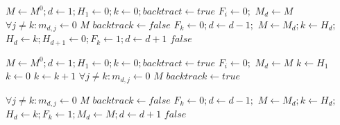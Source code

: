 \documentclass[a4paper, 12pt, ]{book}
\begin{document}
\begin{algorithm}
\label{alg:ullmann1}
\begin{algorithmic}[1]
	\State $M \gets M^0; d \gets 1; H_1 \gets 0; k \gets 0; backtract \gets true$
	 $F_i \gets 0;$ \EndFor
			\State $M_d \gets M$
			\State $\forall j \not = k : m_{d,j} \gets 0$
				\State \Return $M$
			\EndIf
			\State $backtrack \gets false$
		\EndIf
			\State $F_k \gets 0; d \gets d-1;$
				\State $M \gets M_d; k \gets H_d;$
			\EndIf
		\Else
			\State $H_d \gets k; H_{d+1} \gets 0;  F_k \gets 1; d \gets d+1$
		\EndIf
	\EndWhile
	\State \Return $false$	
\end{algorithmic}
\end{algorithm}

\begin{algorithm}
\label{alg:ullmann2}
\begin{algorithmic}[1]
	\State $M \gets M^0; d \gets 1; H_1 \gets 0; k \gets 0; backtract \gets true$
	 $F_i \gets 0;$ \EndFor
			\State $M_d \gets M$
				\State $k \gets H_1$
			\Else
				\State $k \gets 0$
			\EndIf
			\Repeat
				\State $k \gets k+1$
			\State $\forall j \not = k : m_{d,j} \gets 0$
				\State \Return $M$
			\EndIf
		\Else
			\State $backtrack \gets true$
		\EndIf
	
		\State
	
			\State $\forall j \not = k : m_{d,j} \gets 0$
				\State \Return $M$
			\EndIf
			\State $backtrack \gets false$
		\EndIf
			\State $F_k \gets 0; d \gets d-1;$
				\State $M \gets M_d; k \gets H_d;$
			\EndIf
		\Else
			\State $H_d \gets k; F_k \gets 1; M_d \gets M; d \gets d+1$
		\EndIf
	\EndWhile
	\State \Return $false$	
\end{algorithmic}
\end{algorithm}
\end{document}
